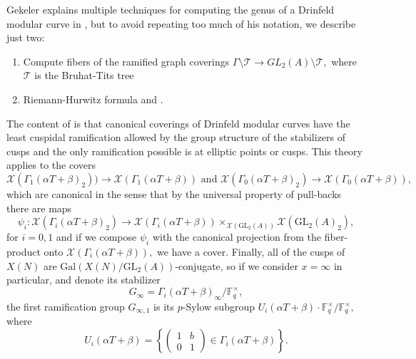 \documentclass[11pt]{amsart}
\newtheorem{remark}[theorem]{Remark}
\theoremstyle{definition}
\numberwithin{equation}{section}
\newcommand{\GL}{\mathrm{GL}} 	%
\newcommand{\Gal}{\mathrm{Gal}} 	%
\newcommand{\sT}{\mathscr{T}}		%
\newcommand{\sX}{\mathscr{X}}		%
\newcommand{\bbF}{\mathbb{F}}		%
\begin{document}

Gekeler explains multiple techniques for computing the genus of a Drinfeld modular curve in \cite[Section $8$]{Gekeler-Invariants}, but to avoid repeating too much of his notation, we describe just two:
\begin{enumerate}
	\item Compute fibers of the ramified graph coverings $\Gamma\setminus \sT\to GL_2(A)\setminus \sT,$ where $\sT$ is the Bruhat-Tits tree
	
	\item Riemann-Hurwitz formula and \cite[Proposition $8.3$]{Gekeler-Invariants}.
\end{enumerate}
The content of \cite[Proposition $8.3$]{Gekeler-Invariants} is that canonical coverings of Drinfeld modular curves have the least cuspidal ramification allowed by the group structure of the stabilizers of cusps and the only ramification possible is at elliptic points or cusps. 
This theory applies to the covers \[\sX(\Gamma_1(\alpha T+\beta)_2))\to \sX(\Gamma_1(\alpha T+\beta))\text{ and }\sX(\Gamma_0(\alpha T+\beta)_2)\to \sX(\Gamma_0(\alpha T+\beta)),\] which are canonical in the sense that by the universal property of pull-backs there are maps 
\[\psi_i:\sX(\Gamma_i(\alpha T+\beta)_2)\to 
\sX(\Gamma_i(\alpha T+\beta))\times_{\sX(\GL_2(A))}\sX(\GL_2(A)_2),\]
for $i=0, 1$ and if we compose $\psi_i$ with the canonical projection from the fiber-product onto $\sX(\Gamma_i(\alpha T+\beta)),$ we have a cover. Finally, all of the cusps of $X(N)$ are $\Gal(X(N)/\GL_2(A))$-conjugate, so if we consider $x=\infty$ in particular, and denote its stabilizer \[G_{\infty}=\Gamma_i(\alpha T+\beta)_{\infty}/\bbF_q^{\times},\] the first ramification group $G_{\infty, 1}$ is its $p$-Sylow subgroup $U_i(\alpha T+\beta)\cdot \bbF_q^{\times}/\bbF_q^{\times},$ where \[U_i(\alpha T+\beta)=\left\{\left(\begin{array}{cc}1&b\\0&1\end{array}\right)\in \Gamma_i(\alpha T+\beta)\right\}.\]
\end{document}
